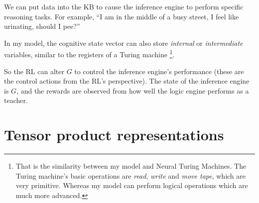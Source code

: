 \documentclass[12pt]{article}
\begin{document}
We can put data into the KB to cause the inference engine to perform specific reasoning tasks.  For example, ``I am in the middle of a busy street, I feel like urinating, should I pee?''

In my model, the cognitive state vector can also store \textit{internal} or \textit{intermediate} variables, similar to the registers of a Turing machine \footnote{That is the similarity between my model and Neural Turing Machines. The Turing machine's basic operations are \textit{read}, \textit{write} and \textit{move tape}, which are very primitive.  Whereas my model can perform logical operations which are much more advanced.}.  

So the RL can alter $G$ to control the inference engine's performance (these are the control actions from the RL's perspective).  The state of the inference engine is $G$, and the rewards are observed from how well the logic engine performs as a teacher.

\section{Tensor product representations}
\end{document}
